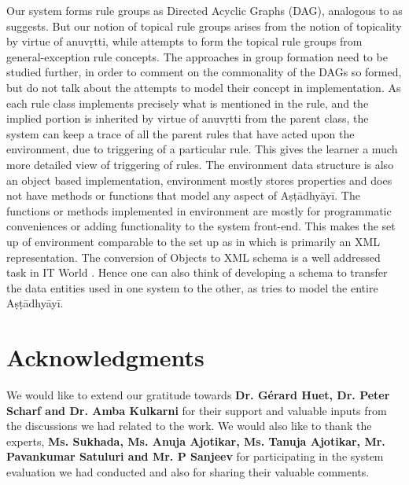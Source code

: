 \documentclass[11pt]{article}
\begin{document}
Our system forms rule groups as Directed Acyclic Graphs (DAG), analogous to as  suggests. But our notion of topical rule groups  arises from the notion of topicality by virtue of anuvṛtti, while  attempts to form the topical rule groups from general-exception rule concepts. The approaches in group formation need to be studied further, in order to comment on the commonality of the DAGs so formed, but  do not talk about the attempts to model their concept in implementation. As each rule class implements precisely what is mentioned in the rule, and the implied portion is inherited by virtue of anuvṛtti from the parent class, the system can keep a trace of all the parent rules that have acted upon the environment, due to triggering of a particular rule. This gives the learner a much more detailed view of triggering of rules. The environment data structure is also an object based implementation, environment mostly stores properties and does not have methods or functions that model any aspect of Aṣṭādhyāyī. The functions or methods implemented in environment are mostly for programmatic conveniences or adding functionality to the system front-end. This makes the set up of environment comparable to the set up as in  which is primarily an XML representation. The conversion of Objects to XML schema is a well addressed task in IT World \cite{jain2002xml}. Hence one can also think of developing a schema to transfer the data entities used in one system to the other, as  tries to model the entire Aṣṭādhyāyī.  

\section*{Acknowledgments}

We would like to extend our gratitude towards \textbf{ Dr. G{\'e}rard Huet, Dr. Peter Scharf and Dr. Amba Kulkarni } for their support and valuable inputs from the discussions we had related to the work. We would also like to thank the experts, \textbf{ Ms. Sukhada, Ms. Anuja Ajotikar, Ms. Tanuja Ajotikar, Mr. Pavankumar Satuluri and Mr. P Sanjeev} for participating in the system evaluation we had conducted and also for sharing their valuable comments.  



\end{document}
